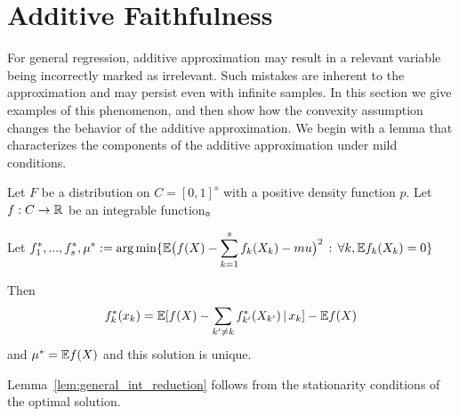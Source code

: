 
\section{Additive Faithfulness}
\label{sec:additivefaithful}

For general regression, additive approximation may result in a
relevant variable being incorrectly marked as irrelevant. Such
mistakes are inherent to the approximation and may persist even with
infinite samples.  In this section we give
examples of this phenomenon, and then show how the convexity
assumption
changes the behavior of the additive approximation. We begin
with a lemma that characterizes the components of the additive approximation under mild conditions.




\begin{lemma}
\label{lem:general_int_reduction}
Let $F$ be a distribution on $C=[0,1]^s$ with a positive density function $p$. Let $f: C \rightarrow {\mathbb R}$ be an integrable function。

Let $\displaystyle f^*_1,...,f^*_s, \mu^* := 
\arg\min \{ {\mathbb E} \big( f(X) - \sum_{k=1}^s f_k(X_k) - mu \big)^2 \,:\, \forall k, {\mathbb E} f_k(X_k) = 0\}$ 

Then 
$$ f^*_k(x_k) = {\mathbb E}[ f(X) - \sum_{k' \neq k} f^*_{k'}(X_{k'}) {\,|\,} x_k] - {\mathbb E} f(X) $$
 and $\mu^* = {\mathbb E} f(X)$ and this solution is unique.
\end{lemma}


Lemma~\ref{lem:general_int_reduction} follows from the stationarity
conditions of the optimal solution. 

